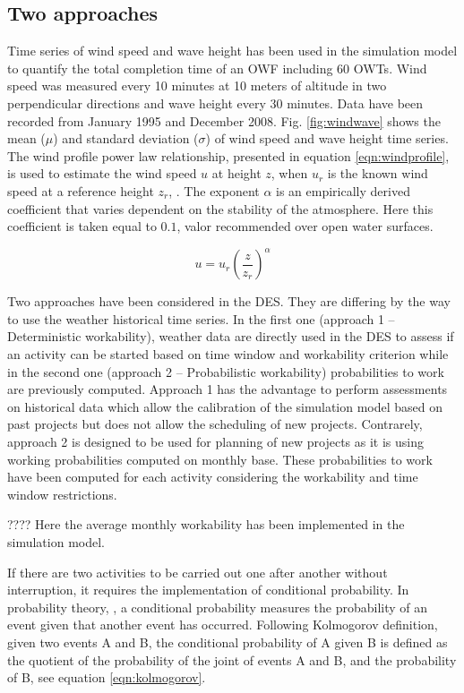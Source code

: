 \subsection{Two approaches}
Time series of wind speed and wave height has been used in the simulation model to quantify the total completion time of an OWF including 60 OWTs. Wind speed was measured every 10 minutes at 10 meters of altitude in two perpendicular directions and wave height every 30 minutes. Data have been recorded from January 1995 and December 2008.
Fig. \ref{fig:windwave} shows the mean ($\mu$) and standard deviation ($\sigma$) of wind speed and wave height time series.
The wind profile power law relationship, presented in equation \ref{eqn:windprofile}, is used to estimate the wind speed $u$ at height $z$, when $u_{r}$ is the known wind speed at a reference height $z_{r}$, \cite{1978Peterson}. The exponent $\alpha$ is an empirically derived coefficient that varies dependent on the stability of the atmosphere. Here this coefficient is taken equal to $0.1$, valor recommended over open water surfaces.

\begin{equation}
\label{eqn:windprofile}
u = u_{r} \left( \frac{z}{z_r} \right)^{\alpha}
\end{equation}

Two approaches have been considered in the DES. They are differing by the way to use the weather historical time series. In the first one (approach 1 -- Deterministic workability), weather data are directly used in the DES to assess if an activity can be started based on time window and workability criterion while in the second one (approach 2 -- Probabilistic workability) probabilities to work are previously computed. Approach 1 has the advantage to perform assessments on historical data which allow the calibration of the simulation model based on past projects but does not allow the scheduling of new projects. Contrarely, approach 2 is designed to be used for planning of new projects as it is using working probabilities computed on monthly base. These probabilities to work have been computed for each activity considering the workability and time window restrictions.

???? Here the average monthly workability has been implemented in the simulation model. 

If there are two activities to be carried out one after another without interruption, it requires the implementation of conditional probability.  
In probability theory, \cite{Thalemann2012}, a conditional probability measures the probability of an event given that another event has occurred. Following Kolmogorov definition, given two events A and B, the conditional probability of A given B is defined as the quotient of the probability of the joint of events A and B, and the probability of B, see equation \ref{eqn:kolmogorov}.

